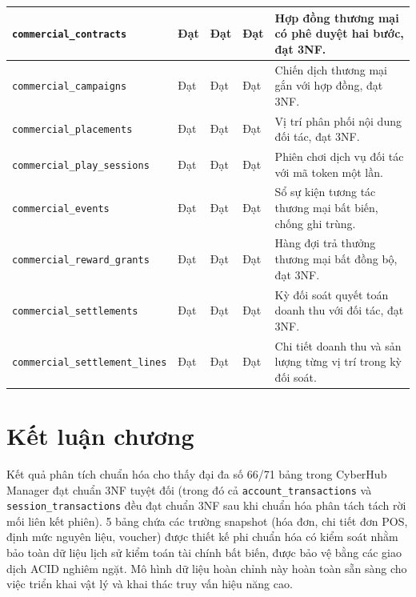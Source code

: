 \begin{table}[htbp]
\begin{tabularx}{\textwidth}{|>{\raggedright\arraybackslash}p{3.2cm}|>{\centering\arraybackslash}p{1.0cm}|>{\centering\arraybackslash}p{1.0cm}|>{\centering\arraybackslash}p{1.6cm}|X|}
\hline
\texttt{commercial\_contracts} & Đạt & Đạt & Đạt & Hợp đồng thương mại có phê duyệt hai bước, đạt 3NF. \\
\hline
\texttt{commercial\_campaigns} & Đạt & Đạt & Đạt & Chiến dịch thương mại gắn với hợp đồng, đạt 3NF. \\
\hline
\texttt{commercial\_placements} & Đạt & Đạt & Đạt & Vị trí phân phối nội dung đối tác, đạt 3NF. \\
\hline
\texttt{commercial\_play\_sessions} & Đạt & Đạt & Đạt & Phiên chơi dịch vụ đối tác với mã token một lần. \\
\hline
\texttt{commercial\_events} & Đạt & Đạt & Đạt & Sổ sự kiện tương tác thương mại bất biến, chống ghi trùng. \\
\hline
\texttt{commercial\_reward\_grants} & Đạt & Đạt & Đạt & Hàng đợi trả thưởng thương mại bất đồng bộ, đạt 3NF. \\
\hline
\texttt{commercial\_settlements} & Đạt & Đạt & Đạt & Kỳ đối soát quyết toán doanh thu với đối tác, đạt 3NF. \\
\hline
\texttt{commercial\_settlement\_lines} & Đạt & Đạt & Đạt & Chi tiết doanh thu và sản lượng từng vị trí trong kỳ đối soát. \\
\hline
\end{tabularx}
\end{table}

\section{Kết luận chương}
Kết quả phân tích chuẩn hóa cho thấy đại đa số 66/71 bảng trong CyberHub Manager đạt chuẩn 3NF tuyệt đối (trong đó cả \texttt{account\_transactions} và \texttt{session\_transactions} đều đạt chuẩn 3NF sau khi chuẩn hóa phân tách tách rời mối liên kết phiên). 5 bảng chứa các trường snapshot (hóa đơn, chi tiết đơn POS, định mức nguyên liệu, voucher) được thiết kế phi chuẩn hóa có kiểm soát nhằm bảo toàn dữ liệu lịch sử kiểm toán tài chính bất biến, được bảo vệ bằng các giao dịch ACID nghiêm ngặt. Mô hình dữ liệu hoàn chỉnh này hoàn toàn sẵn sàng cho việc triển khai vật lý và khai thác truy vấn hiệu năng cao.\par